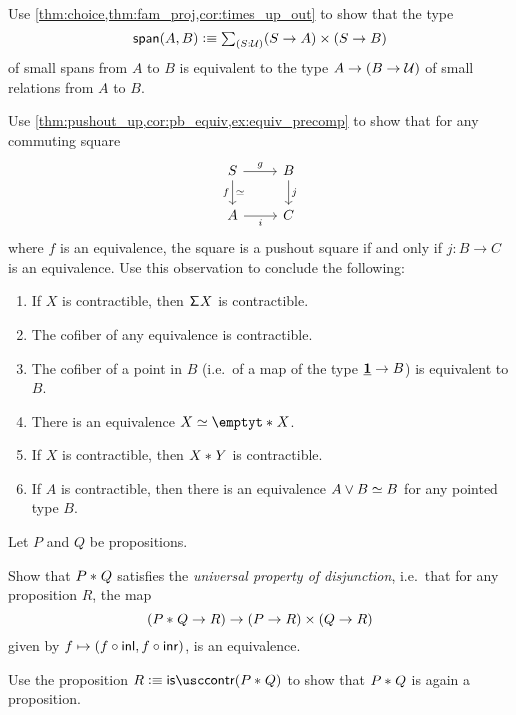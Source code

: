 \begin{exercises}
\item \label{ex:span_rel}Use \cref{thm:choice,thm:fam_proj,cor:times_up_out} to show that the type 
\begin{equation*}
\mathsf{span}(A,B)\defeq \sm{S:\UU} (S\to A)\times (S\to B)
\end{equation*}
of small spans from $A$ to $B$ is equivalent to the type $A\to (B\to\mathcal{U})$ of small relations from $A$ to $B$.
\item \label{ex:pushout_equiv}Use \cref{thm:pushout_up,cor:pb_equiv,ex:equiv_precomp} to show that for any commuting square
\begin{equation*}
\begin{tikzcd}
S \arrow[r,"g"] \arrow[d,swap,"f","{\eqvsym}"'] & B \arrow[d,"j"] \\
A \arrow[r,swap,"i"] & C
\end{tikzcd}
\end{equation*} 
where $f$ is an equivalence, the square is a pushout square if and only if $j:B\to C$ is an equivalence.
Use this observation to conclude the following:
\begin{enumerate}
\item If $X$ is contractible, then $\mathsf{\Sigma}^{} X$ is contractible.
\item The cofiber of any equivalence is contractible.
\item The cofiber of a point in $B$ (i.e.~of a map of the type $\underline{\mathbf{1}}\to B$) is equivalent to $B$.
\item There is an equivalence $\eqv{X}{\join{\emptyt}{X}}$.
\item If $X$ is contractible, then ${X}\ast_{}{Y}$ is contractible. 
\item If $A$ is contractible, then there is an equivalence $\eqv{A\vee B}{B}$ for any pointed type $B$.
\end{enumerate}
\item \label{ex:join_propositions}Let $P$ and $Q$ be propositions.
\begin{subexenum}
\item Show that ${P}\ast_{}{Q}$ satisfies the \emph{universal property of disjunction}, i.e.~that for any proposition $R$, the map
\begin{equation*}
({P}\ast_{}{Q}\to R)\to (P\to R)\times (Q\to R)
\end{equation*}
given by $f\mapsto (f\circ {\mathsf{inl}},f\circ {\mathsf{inr}})$, is an equivalence.
\item Use the proposition $R\defeq\iscontr(\join{P}{Q})$ to show that ${P}\ast_{}{Q}$ is again a proposition.

\end{subexenum}
\end{exercises}
